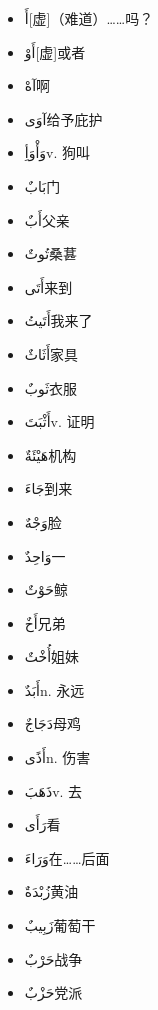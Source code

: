\begin{multicols}{2}
\begin{itemize}
    \item {} \ac{أَ}{[虚]（难道）……吗？}
    \item \ac{أَوْ}{[虚]或者}
    \item \ac{آهْ}{啊}
    \item \ac{آوَى}{给予庇护}
    \item \ac{وَأْوَأِ}{v. 狗叫}

    \item {} \ac{بَابٌ}{门}
    \item \ac{أَبٌ}{父亲}
    \item \ac{تُوتٌ}{桑葚}
    \item \ac{أَتَى}{来到}
    \item \ac{أَتَيتُ}{我来了}
    \item \ac{أَثَاثٌ}{家具}
    \item \ac{ثَوبٌ}{衣服}
    \item \ac{أَثْبَتَ}{v. 证明}
    \item \ac{هَيْئَةٌ}{机构}

    \item {} \ac{جَاءَ}{到来}
    \item \ac{وَجْهٌ}{脸}
    \item \ac{وَاحِدٌ}{一}
    \item \ac{حَوْتٌ}{鲸}
    \item \ac{أَخٌ}{兄弟}
    \item \ac{أُخْتٌ}{姐妹}
    \item \ac{أَبَدٌ}{n. 永远}
    \item \ac{دَجَاجٌ}{母鸡}
    \item \ac{أَذًى}{n. 伤害}
    \item \ac{ذَهَبَ}{v. 去}
    \item \ac{رَأَى}{看}
    \item \ac{وَرَاءَ}{在……后面}
    \item \ac{زُبْدَةٌ}{黄油}
    \item \ac{زَبِيبٌ}{葡萄干}
    \item \ac{حَرْبٌ}{战争}
    \item \ac{حَزْبٌ}{党派}
    

\end{itemize}
\end{multicols}
